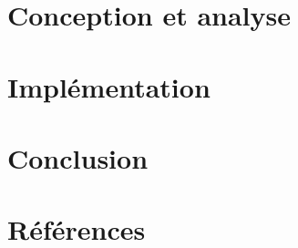 \documentclass[a4paper, 12pt]{article}
\begin{document}
\section{Conception et analyse} %

\newpage

\section{Implémentation} %

\newpage

\section{Conclusion} %

\newpage

\section{Références} %


\end{document}
